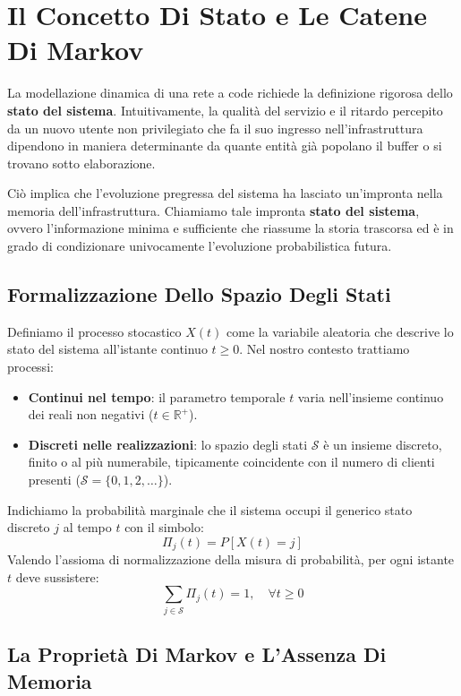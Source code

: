 \documentclass[11pt, a4paper]{article}
\begin{document}
\newpage


\section{Il Concetto Di Stato e Le Catene Di Markov}

La modellazione dinamica di una rete a code richiede la definizione rigorosa dello \textbf{stato del sistema}. Intuitivamente, la qualità del servizio e il ritardo percepito da un nuovo utente non privilegiato che fa il suo ingresso nell'infrastruttura dipendono in maniera determinante da quante entità già popolano il buffer o si trovano sotto elaborazione.

Ciò implica che l'evoluzione pregressa del sistema ha lasciato un'impronta nella memoria dell'infrastruttura. Chiamiamo tale impronta \textbf{stato del sistema}, ovvero l'informazione minima e sufficiente che riassume la storia trascorsa ed è in grado di condizionare univocamente l'evoluzione probabilistica futura.

\subsection{Formalizzazione Dello Spazio Degli Stati}

Definiamo il processo stocastico $X(t)$ come la variabile aleatoria che descrive lo stato del sistema all'istante continuo $t \ge 0$. Nel nostro contesto trattiamo processi:
\begin{itemize}
    \item \textbf{Continui nel tempo}: il parametro temporale $t$ varia nell'insieme continuo dei reali non negativi ($t \in \mathbb{R}^+$).
    \item \textbf{Discreti nelle realizzazioni}: lo spazio degli stati $\mathcal{S}$ è un insieme discreto, finito o al più numerabile, tipicamente coincidente con il numero di clienti presenti ($\mathcal{S} = \{0, 1, 2, \dots\}$).
\end{itemize}

Indichiamo la probabilità marginale che il sistema occupi il generico stato discreto $j$ al tempo $t$ con il simbolo:
\[
    \Pi_j(t) = P[X(t) = j]
\]
Valendo l'assioma di normalizzazione della misura di probabilità, per ogni istante $t$ deve sussistere:
\[
    \boxed{\sum_{j \in \mathcal{S}} \Pi_j(t) = 1, \quad \forall t \ge 0}
\]

\subsection{La Propriet\`a Di Markov e L'Assenza Di Memoria}
\end{document}
